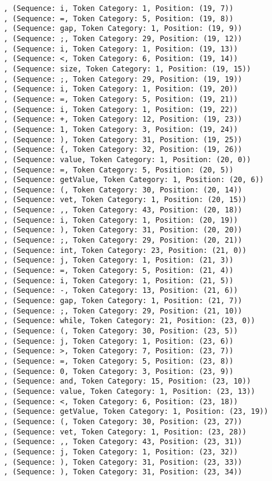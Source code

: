 \documentclass[a4paper, 12pt, article]{memoir}
\begin{document}
\begin{lstlisting}
, (Sequence: i, Token Category: 1, Position: (19, 7))
, (Sequence: =, Token Category: 5, Position: (19, 8))
, (Sequence: gap, Token Category: 1, Position: (19, 9))
, (Sequence: ;, Token Category: 29, Position: (19, 12))
, (Sequence: i, Token Category: 1, Position: (19, 13))
, (Sequence: <, Token Category: 6, Position: (19, 14))
, (Sequence: size, Token Category: 1, Position: (19, 15))
, (Sequence: ;, Token Category: 29, Position: (19, 19))
, (Sequence: i, Token Category: 1, Position: (19, 20))
, (Sequence: =, Token Category: 5, Position: (19, 21))
, (Sequence: i, Token Category: 1, Position: (19, 22))
, (Sequence: +, Token Category: 12, Position: (19, 23))
, (Sequence: 1, Token Category: 3, Position: (19, 24))
, (Sequence: ), Token Category: 31, Position: (19, 25))
, (Sequence: {, Token Category: 32, Position: (19, 26))
, (Sequence: value, Token Category: 1, Position: (20, 0))
, (Sequence: =, Token Category: 5, Position: (20, 5))
, (Sequence: getValue, Token Category: 1, Position: (20, 6))
, (Sequence: (, Token Category: 30, Position: (20, 14))
, (Sequence: vet, Token Category: 1, Position: (20, 15))
, (Sequence: ,, Token Category: 43, Position: (20, 18))
, (Sequence: i, Token Category: 1, Position: (20, 19))
, (Sequence: ), Token Category: 31, Position: (20, 20))
, (Sequence: ;, Token Category: 29, Position: (20, 21))
, (Sequence: int, Token Category: 23, Position: (21, 0))
, (Sequence: j, Token Category: 1, Position: (21, 3))
, (Sequence: =, Token Category: 5, Position: (21, 4))
, (Sequence: i, Token Category: 1, Position: (21, 5))
, (Sequence: -, Token Category: 13, Position: (21, 6))
, (Sequence: gap, Token Category: 1, Position: (21, 7))
, (Sequence: ;, Token Category: 29, Position: (21, 10))
, (Sequence: while, Token Category: 21, Position: (23, 0))
, (Sequence: (, Token Category: 30, Position: (23, 5))
, (Sequence: j, Token Category: 1, Position: (23, 6))
, (Sequence: >, Token Category: 7, Position: (23, 7))
, (Sequence: =, Token Category: 5, Position: (23, 8))
, (Sequence: 0, Token Category: 3, Position: (23, 9))
, (Sequence: and, Token Category: 15, Position: (23, 10))
, (Sequence: value, Token Category: 1, Position: (23, 13))
, (Sequence: <, Token Category: 6, Position: (23, 18))
, (Sequence: getValue, Token Category: 1, Position: (23, 19))
, (Sequence: (, Token Category: 30, Position: (23, 27))
, (Sequence: vet, Token Category: 1, Position: (23, 28))
, (Sequence: ,, Token Category: 43, Position: (23, 31))
, (Sequence: j, Token Category: 1, Position: (23, 32))
, (Sequence: ), Token Category: 31, Position: (23, 33))
, (Sequence: ), Token Category: 31, Position: (23, 34))

\end{lstlisting}
\end{document}
